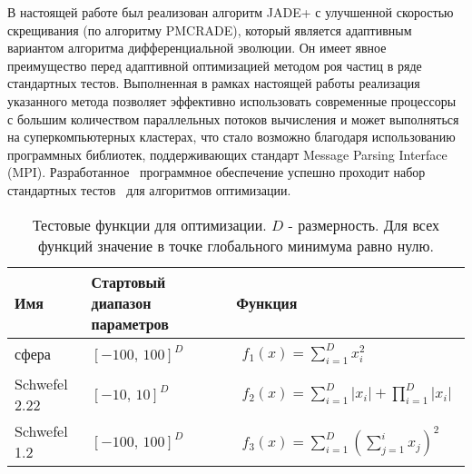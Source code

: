 В настоящей работе был реализован алгоритм JADE+ с улучшенной
скоростью скрещивания (по алгоритму PMCRADE), который является
адаптивным вариантом алгоритма дифференциальной эволюции. Он имеет
явное преимущество перед адаптивной оптимизацией методом роя частиц в
ряде стандартных тестов.  Выполненная в рамках настоящей работы
реализация указанного метода позволяет эффективно использовать
современные процессоры с большим количеством параллельных потоков
вычисления и может выполняться на суперкомпьютерных кластерах, что
стало возможно благодаря использованию программных библиотек,
поддерживающих стандарт Message Parsing Interface (MPI).
Разработанное~\cite{JADE-web} программное обеспечение успешно проходит
набор стандартных тестов~\cite{Schwefel-1981,Rosenbrock-1960,Muhlenbein-1991,back-1996,Griewank-1981} для алгоритмов оптимизации. 
\begin{table} [ht]%
	\caption{Тестовые функции для оптимизации. $D$ -
          размерность. Для всех функций значение в точке глобального
          минимума равно нулю. }%
	\label{tbl:test-functions}%
    \renewcommand{\arraystretch}{1.6}%
	\def\tabularxcolumn#1{m{#1}}
	\begin{tabularx}{\textwidth}{@{}>{\centering}m{2.9cm}>{\centering}m{3.1cm}>{\raggedright\arraybackslash}X@{}}%
        \toprule     %
        Имя           & Стартовый диапазон параметров & Функция                                                                           \\
        \midrule %
        сфера         & $\left[-100,\,100\right]^D$   &
        $\begin{aligned}\textstyle f_1(x)=\sum_{i=1}^Dx_i^2\end{aligned}$                                                        \\
        Schwefel 2.22 & $\left[-10,\,10\right]^D$     &
        $\begin{aligned}\textstyle f_2(x)=\sum_{i=1}^D|x_i|+\prod_{i=1}^D|x_i|\end{aligned}$                                     \\
        Schwefel 1.2  & $\left[-100,\,100\right]^D$   & $\begin{aligned}\textstyle f_3(x)=\sum_{i=1}^D\left(\sum_{j=1}^ix_j\right)^2\end{aligned}$                               \\

\end{tabularx}
\end{table}

